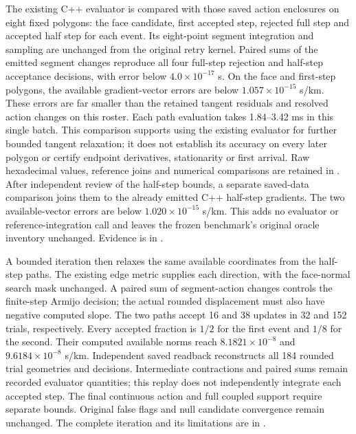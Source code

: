 The existing C++ evaluator is compared with those saved action enclosures
on eight fixed polygons: the face candidate, first accepted step, rejected
full step and accepted half step for each event. Its eight-point segment
integration and sampling are unchanged from the original retry kernel.
Paired sums of the emitted segment changes reproduce all four full-step
rejection and half-step acceptance decisions, with error below
$4.0\times10^{-17}$ s. On the face and first-step polygons, the available
gradient-vector errors are below $1.057\times10^{-15}$ s/km. These errors
are far smaller than the retained tangent residuals and resolved action
changes on this roster. Each path evaluation takes 1.84--3.42 ms in this
single batch. This comparison supports using the existing evaluator for
further bounded tangent relaxation; it does not establish its accuracy on
every later polygon or certify endpoint derivatives, stationarity or first
arrival. Raw hexadecimal values, reference joins and numerical comparisons
are retained in
.
After independent review of the half-step bounds, a separate saved-data
comparison joins them to the already emitted C++ half-step gradients.
The two available-vector errors are below $1.020\times10^{-15}$ s/km.
This adds no evaluator or reference-integration call and leaves the frozen
benchmark's original oracle inventory unchanged. Evidence is in
.

A bounded iteration then relaxes the same available coordinates from the
half-step paths. The existing edge metric supplies each direction, with
the face-normal search mask unchanged. A paired sum of segment-action
changes controls the finite-step Armijo decision; the actual rounded
displacement must also have negative computed slope. The two paths accept
16 and 38 updates in 32 and 152 trials, respectively. Every accepted fraction
is $1/2$ for the first event and $1/8$ for the second. Their computed available
norms reach $8.1821\times10^{-8}$ and $9.6184\times10^{-8}$ s/km.
Independent saved readback reconstructs all 184 rounded trial geometries
and decisions. Intermediate contractions and paired sums remain recorded
evaluator quantities; this replay does not independently integrate each
accepted step. The final continuous action and full coupled support require
separate bounds. Original false flags and null candidate convergence remain
unchanged. The complete iteration and its limitations are in
.

